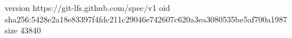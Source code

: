 version https://git-lfs.github.com/spec/v1
oid sha256:5428e2a18e83397f4fdc211c29046e742607c620a3ea3080535be5af700a1987
size 43840
